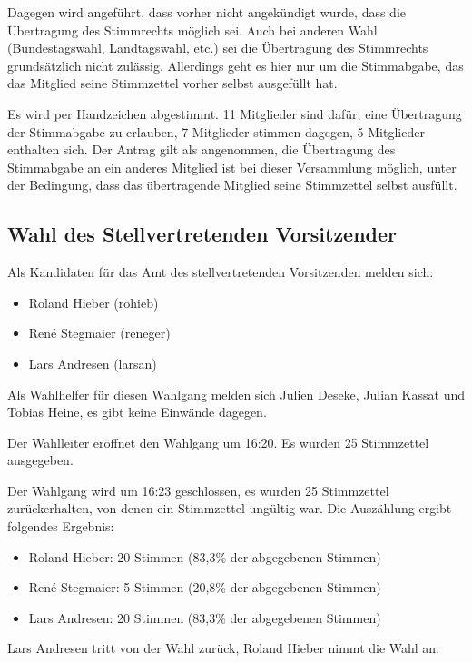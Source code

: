 \documentclass[a4paper,12pt]{scrartcl}
\begin{document}
Dagegen wird angeführt, dass vorher nicht angekündigt wurde, dass die
Übertragung des Stimmrechts möglich sei. Auch bei anderen Wahl (Bundestagswahl,
Landtagswahl, etc.) sei die Übertragung des Stimmrechts grundsätzlich nicht
zulässig. Allerdings geht es hier nur um die Stimmabgabe, das das Mitglied seine
Stimmzettel vorher selbst ausgefüllt hat.

Es wird per Handzeichen abgestimmt. 11 Mitglieder sind dafür, eine Übertragung
der Stimmabgabe zu erlauben, 7 Mitglieder stimmen dagegen, 5 Mitglieder
enthalten sich. Der Antrag gilt als angenommen, die Übertragung des Stimmabgabe
an ein anderes Mitglied ist bei dieser Versammlung möglich, unter der Bedingung,
dass das übertragende Mitglied seine Stimmzettel selbst ausfüllt.

\subsection{Wahl des Stellvertretenden Vorsitzender}
Als Kandidaten für das Amt des stellvertretenden Vorsitzenden melden sich:
\begin{itemize}
  \item Roland Hieber (rohieb)
  \item René Stegmaier (reneger)
  \item Lars Andresen (larsan)
\end{itemize}

Als Wahlhelfer für diesen Wahlgang melden sich Julien Deseke, Julian Kassat und
Tobias Heine, es gibt keine Einwände dagegen.

Der Wahlleiter eröffnet den Wahlgang um 16:20. Es wurden 25 Stimmzettel
ausgegeben.

Der Wahlgang wird um 16:23 geschlossen, es wurden 25 Stimmzettel zurückerhalten,
von denen ein Stimmzettel ungültig war. Die Auszählung ergibt folgendes
Ergebnis:

\begin{itemize}
  \item Roland Hieber: 20 Stimmen (83{,}3\% der abgegebenen Stimmen)
  \item René Stegmaier: 5 Stimmen (20{,}8\% der abgegebenen Stimmen)
  \item Lars Andresen: 20 Stimmen (83{,}3\% der abgegebenen Stimmen)
\end{itemize}

Lars Andresen tritt von der Wahl zurück, Roland Hieber nimmt die Wahl an.
\end{document}
